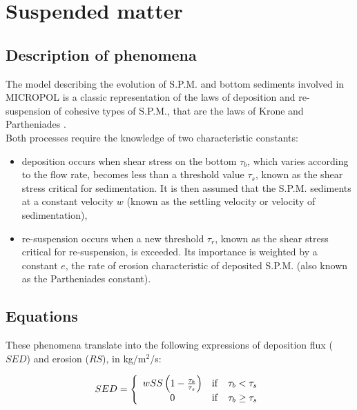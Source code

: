 \section{Suspended matter}

\subsection{Description of phenomena}

The model describing the evolution of S.P.M. and bottom sediments involved in MICROPOL
is a classic representation of the laws of deposition and re-suspension
of cohesive types of S.P.M., that are the laws of Krone \cite{krone_flume_1962}
and Partheniades \cite{partheniades_erosion_deposition_1965}.\\

Both processes require the knowledge of two characteristic constants:

\begin{itemize}
\item deposition occurs when shear stress on the bottom $\tau_b$,
  which varies according to the flow rate, becomes less than a threshold value $\tau_s$,
  known as the shear stress critical for sedimentation.
  It is then assumed that the S.P.M. sediments at a constant velocity $w$
  (known as the settling velocity or velocity of sedimentation),
\item re-suspension occurs when a new threshold $\tau_r$,
  known as the shear stress critical for re-suspension, is exceeded.
  Its importance is weighted by a constant $e$, the rate of erosion characteristic
  of deposited S.P.M. (also known as the Partheniades constant).
\end{itemize}

\subsection{Equations}

These phenomena translate into the following expressions of deposition flux ($SED$) and erosion ($RS$),
in kg/m$^2$/s:

\begin{equation}
  SED = \left\{
    \begin{array}{ccl}
      wSS \left( 1 - \frac{\tau_b}{\tau_s} \right) & \rm{if} & \tau_b < \tau_s\\
      0 & \rm{if} & \tau_b \ge \tau_s
    \end{array}
    \right .
\end{equation}

